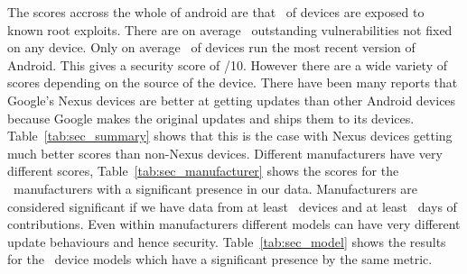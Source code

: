 The scores accross the whole of android are that \daMeanInsecurityPerc\ of devices are exposed to known root exploits.
There are on average \daMeanOutstandingVulnerabilities\ outstanding vulnerabilities not fixed on any device.
Only on average \daUpdatednessPerc\ of devices run the most recent version of Android.
This gives a security score of \daSecurityScore/10.
\daTabSecScoressummary
However there are a wide variety of scores depending on the source of the device.
There have been many reports that Google's Nexus devices are better at getting updates than other Android devices because Google makes the original updates and ships them to its devices.
Table~\ref{tab:sec_summary} shows that this is the case with Nexus devices getting much better scores than non-Nexus devices.
\daTabSecScoresmanufacturer
Different manufacturers have very different scores, Table~\ref{tab:sec_manufacturer} shows the scores for the \daNumSigManufacturers\ manufacturers with a significant presence in our data.
Manufacturers are considered significant if we have data from at least \daSigNumDevices\ devices and at least \daSigNumDays\ days of contributions.
\daTabSecScoresmodel
Even within manufacturers different models can have very different update behaviours and hence security.
Table~\ref{tab:sec_model} shows the results for the \daNumSigModels\ device models which have a significant presence by the same metric.

